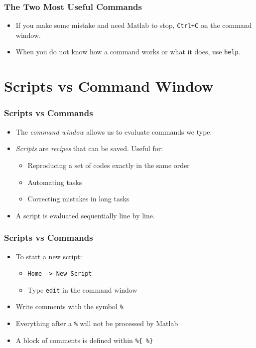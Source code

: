 \documentclass[11pt,xcolor={svgnames},aspectratio=169,usepdftitle=false,notheorems]{beamer}
\begin{document}
\begin{frame}[fragile]
    \frametitle{The Two Most Useful Commands}
\begin{itemize}
    \item If you make some mistake and need Matlab to stop, \verb;Ctrl+C; on the command window.
    \item When you do not know how a command works or what it does, use \verb;help;.
\end{itemize}
\end{frame}

\section{Scripts vs Command Window}

\begin{frame}
    \frametitle{Scripts vs Commands}
\begin{itemize}
    \item The \alert{\textit{command window}} allows us to evaluate commands we type.
    \item \alert{\textit{Scripts}} are \textit{recipes} that can be saved. Useful for:
    \begin{itemize}
        \item Reproducing a set of codes \alert{exactly} in the same order
        \item Automating tasks
        \item Correcting mistakes in long tasks
    \end{itemize}
    \item A script is evaluated sequentially line by line.
\end{itemize}
\end{frame}

\begin{frame}[fragile]
    \frametitle{Scripts vs Commands}
    \begin{itemize}
        \item To start a new script:
        \begin{itemize}
            \item \verb;Home -> New Script;
            \item Type \verb;edit; in the command window
        \end{itemize}
        \item Write comments with the symbol \verb;%; 
        \item Everything after a \verb;%; will not be processed by Matlab
        \item A block of comments is defined within \verb;%{ %};
    \end{itemize}
\end{frame}
\end{document}
